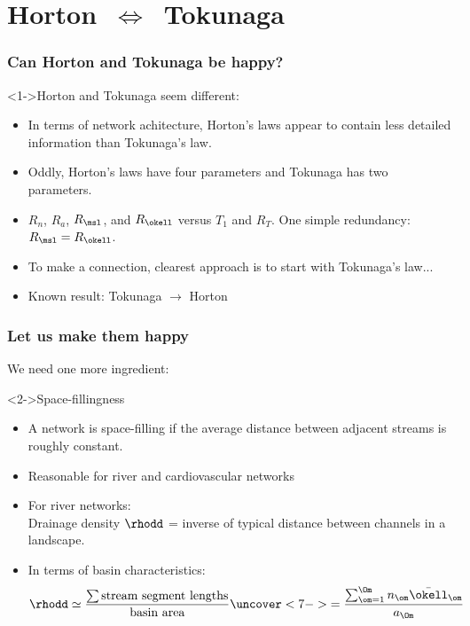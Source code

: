 
\section{Horton\ \texorpdfstring{$\Leftrightarrow$}{is\ equivalent\ to}\ Tokunaga}

\begin{frame}[label=]
  \frametitle{Can Horton and Tokunaga be happy?}

  \begin{block}<1->{Horton and Tokunaga seem different:}
    \begin{itemize}
      \item<2-> In terms of network achitecture, 
        Horton's laws appear to contain less
        detailed information than Tokunaga's law.
      \item<3-> Oddly, Horton's laws have \alert{four} parameters
        and Tokunaga has \alert{two} parameters.
      \item<4-> $R_n$, $R_a$, $R_\msl$, and $R_\okell$ \alert{versus} $T_1$ and $R_T$.
        One simple redundancy: $R_\msl = R_\okell$.\\
      \item<5-> To make a connection, clearest approach
        is to start with Tokunaga's law...
      \item<6-> Known result: Tokunaga $\rightarrow$ Horton\cite{tokunaga1966a,tokunaga1978a,tokunaga1984a,peckham1995a,dodds1999a}
    \end{itemize}
  \end{block}

\end{frame}

\begin{frame}[label=]
  \frametitle{Let us make them happy}

  \alert{We need one more ingredient:}

  \begin{block}<2->{Space-fillingness}
    \begin{itemize}
    \item<3-> A network is \alert{space-filling}
      if the average distance between adjacent streams
      is roughly constant.
    \item<4-> Reasonable for river and cardiovascular networks
    \item<5-> For river networks:\\
      \alert{Drainage density $\rhodd$} = inverse of typical distance between
      channels in a landscape.
    \item<6-> In terms of basin characteristics:
      $$
      \rhodd \simeq \frac{\sum \mbox{stream segment lengths}}{\mbox{basin area}}
      \uncover<7->{= \frac{\sum_{\om=1}^{\Om} n_\om \bar{\okell}_\om} { a_\Om}}
      $$
    \end{itemize}
  \end{block}

\end{frame}

